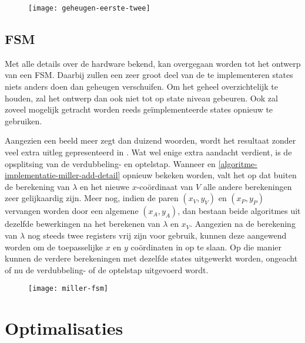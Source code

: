 \begin{figure}[h]
	\centering
		\texttt{[image: geheugen-eerste-twee]}
		\label{figuur-implementatie-geheugen-eerste-twee}
\end{figure}

\subsection{FSM}

Met alle details over de hardware bekend, kan overgegaan worden tot het ontwerp van een FSM. Daarbij zullen een zeer groot deel van de te implementeren states niets anders doen dan geheugen verschuifen. Om het geheel overzichtelijk te houden, zal het ontwerp dan ook niet tot op state niveau gebeuren. Ook zal zoveel mogelijk getracht worden reeds ge\"implementeerde states opnieuw te gebruiken.

Aangezien een beeld meer zegt dan duizend woorden, wordt het resultaat zonder veel extra uitleg gepresenteerd in . Wat wel enige extra aandacht verdient, is de opsplitsing van de verdubbeling- en optelstap. Wanneer  en \ref{algoritme-implementatie-miller-add-detail} opnieuw bekeken worden, valt het op dat buiten de berekening van $\lambda$ en het nieuwe $x$-co\"ordinaat van $V$ alle andere berekeningen zeer gelijkaardig zijn. Meer nog, indien de paren $(x_V, y_V)$ en $(x_P, y_P)$ vervangen worden door een algemene $(x_A, y_A)$, dan bestaan beide algoritmes uit dezelfde bewerkingen na het berekenen van $\lambda$ en $x_V$. Aangezien na de berekening van $\lambda$ nog steeds twee registers vrij zijn voor gebruik, kunnen deze aangewend worden om de toepasselijke $x$ en $y$ co\"ordinaten in op te slaan. Op die manier kunnen de verdere berekeningen met dezelfde states uitgewerkt worden, ongeacht of nu de verdubbeling- of de optelstap uitgevoerd wordt.

\begin{figure}[h]
	\centering
		\texttt{[image: miller-fsm]}
		\label{figuur-miller-fsm}
\end{figure}

\section{Optimalisaties}

